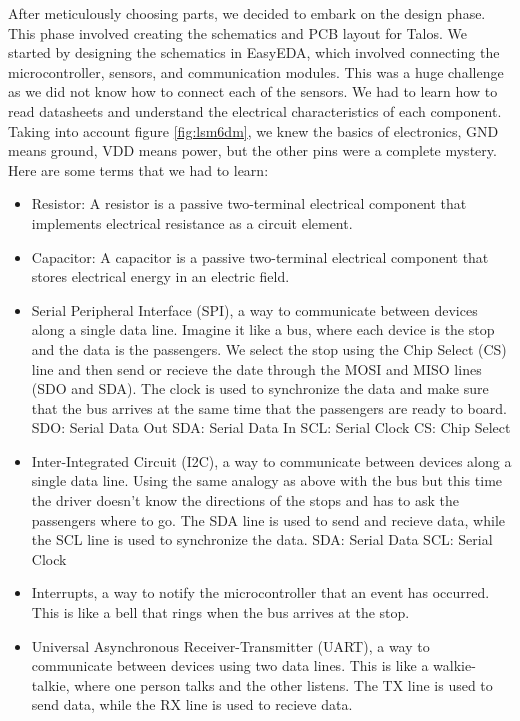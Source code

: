 \documentclass{article}
\begin{document}
After meticulously choosing parts, we decided to embark on the design phase. This phase involved creating the schematics and PCB layout for Talos. We started by designing the schematics in EasyEDA, which involved connecting the microcontroller, sensors, and communication modules. This was a huge challenge as we did not know how to connect each of the sensors. We had to learn how to read datasheets and understand the electrical characteristics of each component. Taking into account figure \ref{fig:lsm6dm}, we knew the basics of electronics, GND means ground, VDD means power, but the other pins were a complete mystery. Here are some terms that we had to learn:
\begin{itemize}
      \item Resistor: A resistor is a passive two-terminal electrical component that implements electrical resistance as a circuit element.
      \item Capacitor: A capacitor is a passive two-terminal electrical component that stores electrical energy in an electric field.
      \item Serial Peripheral Interface (SPI), a way to communicate between devices along a single data line. Imagine it like a bus, where each device is the stop and the data is the passengers. We select the stop using the Chip Select (CS) line and then send or recieve the date through the MOSI and MISO lines (SDO and SDA). The clock is used to synchronize the data and make sure that the bus arrives at the same time that the passengers are ready to board.
            \subitem SDO: Serial Data Out
            \subitem SDA: Serial Data In
            \subitem SCL: Serial Clock
            \subitem CS: Chip Select
      \item Inter-Integrated Circuit (I2C), a way to communicate between devices along a single data line. Using the same analogy as above with the bus but this time the driver doesn't know the directions of the stops and has to ask the passengers where to go. The SDA line is used to send and recieve data, while the SCL line is used to synchronize the data.
            \subitem SDA: Serial Data
            \subitem SCL: Serial Clock
      \item Interrupts, a way to notify the microcontroller that an event has occurred. This is like a bell that rings when the bus arrives at the stop.
      \item Universal Asynchronous Receiver-Transmitter (UART), a way to communicate between devices using two data lines. This is like a walkie-talkie, where one person talks and the other listens. The TX line is used to send data, while the RX line is used to recieve data.

\end{itemize}
\end{document}
